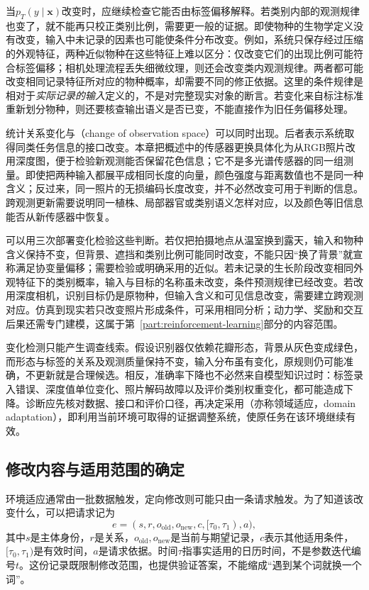 当$p_T(y\mid\bm{x})$改变时，应继续检查它能否由标签偏移解释。若类别内部的观测规律也变了，就不能再只校正类别比例，需要更一般的证据。即使物种的生物学定义没有改变，输入中未记录的因素也可能使条件分布改变。例如，系统只保存经过压缩的外观特征，两种近似物种在这些特征上难以区分：仅改变它们的出现比例可能符合标签偏移；相机处理流程丢失细微纹理，则还会改变类内观测规律。两者都可能改变相同记录特征所对应的物种概率，却需要不同的修正依据。这里的条件规律是相对于\emph{实际记录的输入}定义的，不是对完整现实对象的断言。若变化来自标注标准重新划分物种，则还要核查输出语义是否已变，不能直接作为旧任务偏移处理。

统计关系变化与（change of observation space）可以同时出现。后者表示系统取得同类任务信息的接口改变。本章把概述中的传感器更换具体化为从RGB照片改用深度图，便于检验新观测能否保留花色信息；它不是多光谱传感器的同一组测量。即使把两种输入都展平成相同长度的向量，颜色强度与距离数值也不是同一种含义；反过来，同一照片的无损编码长度改变，并不必然改变可用于判断的信息。跨观测更新需要说明同一植株、局部器官或类别语义怎样对应，以及颜色等旧信息能否从新传感器中恢复。

可以用三次部署变化检验这些判断。若仅把拍摄地点从温室换到露天，输入和物种含义保持不变，但背景、遮挡和类别比例可能同时改变，不能只因“换了背景”就宣称满足协变量偏移；需要检验或明确采用的近似。若未记录的生长阶段改变相同外观特征下的类别概率，输入与目标的名称虽未改变，条件预测规律已经改变。若改用深度相机，识别目标仍是原物种，但输入含义和可见信息改变，需要建立跨观测对应。仿真到现实若只改变照片形成条件，可采用相同分析；动力学、奖励和交互后果还需专门建模，这属于第~\ref{part:reinforcement-learning}部分的内容范围。

变化检测只能产生调查线索。假设识别器仅依赖花瓣形态，背景从灰色变成绿色，而形态与标签的关系及观测质量保持不变，输入分布虽有变化，原规则仍可能准确，不更新就是合理候选。相反，准确率下降也不必然来自模型知识过时：标签录入错误、深度值单位变化、照片解码故障以及评价类别权重变化，都可能造成下降。诊断应先核对数据、接口和评价口径，再决定采用（亦称领域适应，domain adaptation），即利用当前环境可取得的证据调整系统，使原任务在该环境继续有效。

\subsection{修改内容与适用范围的确定}
\label{sec:ket-update-scope}

环境适应通常由一批数据触发，定向修改则可能只由一条请求触发。为了知道该改变什么，可以把请求记为
\begin{equation}
e=(s,r,o_{\mathrm{old}},o_{\mathrm{new}},c,[\tau_0,\tau_1),a),
\label{eq:ket-update-request}
\end{equation}
其中$s$是主体身份，$r$是关系，$o_{\mathrm{old}},o_{\mathrm{new}}$是当前与期望记录，$c$表示其他适用条件，$[\tau_0,\tau_1)$是有效时间，$a$是请求依据。时间$\tau$指事实适用的日历时间，不是参数迭代编号$t$。这份记录既限制修改范围，也提供验证答案，不能缩成“遇到某个词就换一个词”。

